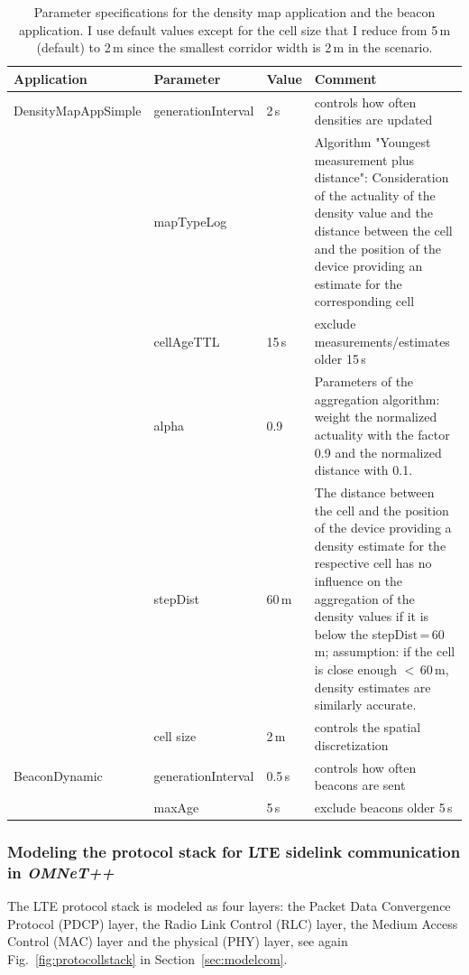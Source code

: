 \begin{table}[hbt!]
\begin{footnotesize}
\begin{tabular}{p{3.1cm}p{2.4cm}p{0.7cm}p{7cm}}
\hline
Application  & Parameter & Value & Comment\\
\hline
DensityMapAppSimple &generationInterval & 2\,s & controls how often densities are updated\\
&mapTypeLog&  & Algorithm "Youngest measurement plus distance": Consideration of the actuality of the density value and the distance between the cell and the position of the device providing an estimate for the corresponding cell\\ 
&cellAgeTTL& 15\,s& exclude measurements/estimates older 15\,s \\
&alpha& 0.9 & Parameters of the aggregation algorithm: weight the normalized actuality with the factor 0.9 and the normalized distance with 0.1. 
\\
&stepDist& 60\,m & The distance between the cell and the position of the device providing a density estimate for the respective cell has no influence on the aggregation of the density values if it is below the stepDist\,=\,60\,m; assumption: if the cell is close enough \mbox{$<$\,60\,m}, density estimates are similarly accurate.  \\
&cell size & 2\,m& controls the spatial discretization  \\
BeaconDynamic & generationInterval & 0.5\,s & controls how often beacons are sent\\
 & maxAge & 5\,s & exclude beacons older 5\,s\\
\hline
\end{tabular}
\end{footnotesize}
\caption[Configuration of the density map application]{Parameter specifications for the density map application and the beacon application. I use default values except for the cell size that I reduce from 5\,m (default) to 2\,m since the smallest corridor width is 2\,m in the scenario.}
\label{ref:densitymapparameters}
\end{table}


\subsubsection{Modeling the protocol stack for LTE sidelink communication in \textit{OMNeT++}}


The LTE protocol stack is modeled as four layers: the Packet Data Convergence Protocol (PDCP) layer, the Radio Link Control (RLC) layer, the Medium Access Control (MAC) layer and the physical (PHY) layer, see again Fig.~\ref{fig:protocollstack} in Section~\ref{sec:modelcom}.


